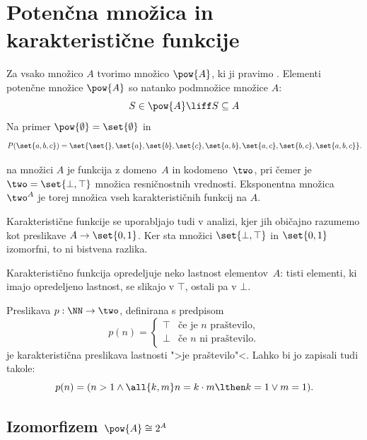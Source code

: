 \section{Potenčna množica in karakteristične funkcije}

Za vsako množico $A$ tvorimo množico $\pow{A}$, ki ji pravimo .
Elementi potenčne množice $\pow{A}$ so natanko podmnožice množice $A$:
%
\begin{equation*}
    S \in \pow{A} \liff S \subseteq A
\end{equation*}
%
Na primer $\pow{\emptyset} = \set{\emptyset}$ in
%
\begin{equation*}
  P(\set{a,b,c}) = \set{\set{}, \set{a}, \set{b}, \set{c}, \set{a,b}, \set{a,c}, \set{b,c}, \set{a,b,c}}.
\end{equation*}


 na množici $A$ je funkcija z domeno~$A$ in kodomeno~$\two$, pri čemer je $\two = \set{\bot, \top}$ množica resničnostnih vrednosti.
%
Eksponentna množica $\two^A$ je torej množica vseh karakterističnih funkcij na $A$.

\begin{opomba}
  Karakteristične funkcije se uporabljajo tudi v analizi, kjer jih
  običajno razumemo kot preslikave $A \to \set{0,1}$. Ker sta množici $\set{\bot,\top}$ in $\set{0,1}$ izomorfni, to ni bistvena razlika.
\end{opomba}

Karakteristično funkcija opredeljuje neko lastnost elementov~$A$: tisti elementi, ki imajo opredeljeno lastnost, se
slikajo v $\top$, ostali pa v $\bot$.

\begin{zgled}
  Preslikava $p : \NN \to \two$, definirana s predpisom
  \begin{equation*}
    p(n) = 
    \begin{cases}
      \top & \text{če je $n$ praštevilo}, \\
      \bot & \text{če $n$ ni praštevilo}.
    \end{cases}
  \end{equation*}
  je karakteristična preslikava lastnosti ">je praštevilo"<. Lahko bi jo zapisali tudi takole:
  \begin{equation*}
    p(n) = (n > 1 \land \all{k, m} n = k \cdot m \lthen k = 1 \lor m = 1).
  \end{equation*}
\end{zgled}


\subsection{Izomorfizem $\pow{A} \cong 2^A$}

